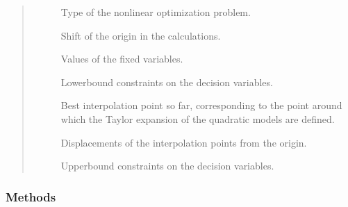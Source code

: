 \documentclass[letterpaper,10pt,english]{sphinxmanual}
\begin{document}
\begin{fulllineitems}
\begin{quote}
\begin{description}
\begin{description}
\item[{}] \leavevmode
\sphinxAtStartPar
Type of the nonlinear optimization problem.

\item[{}] \leavevmode
\sphinxAtStartPar
Shift of the origin in the calculations.

\item[{}] \leavevmode
\sphinxAtStartPar
Values of the fixed variables.

\item[{}] \leavevmode
\sphinxAtStartPar
Lower\sphinxhyphen{}bound constraints on the decision variables.

\item[{}] \leavevmode
\sphinxAtStartPar
Best interpolation point so far, corresponding to the point around which the Taylor expansion of the quadratic models are defined.

\item[{}] \leavevmode
\sphinxAtStartPar
Displacements of the interpolation points from the origin.

\item[{}] \leavevmode
\sphinxAtStartPar
Upper\sphinxhyphen{}bound constraints on the decision variables.

\end{description}

\end{description}\end{quote}
\subsubsection*{Methods}


\begin{savenotes}\sphinxatlongtablestart\begin{longtable}[c]{}
\hline

\endfirsthead

%
{}\\
\hline

\endhead

\hline
{}\\
\endfoot


\end{longtable}
\end{savenotes}
\end{fulllineitems}
\end{document}
